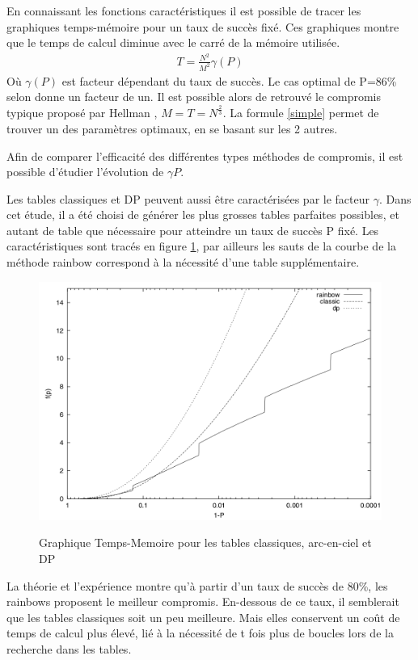 	En connaissant les fonctions caractéristiques il est possible de tracer les graphiques temps-mémoire pour un taux de succès fixé. Ces graphiques montre que le temps de calcul diminue avec le carré de la mémoire utilisée.
\begin{align*}\label{simple}
	T=\frac{N^2}{M^2}\gamma(P)
\end{align*}
	Où $\gamma(P)$ est facteur dépendant du taux de succès. Le cas optimal de P=86\% selon \cite{checkpoints} donne un facteur de un. Il est possible alors de retrouvé le compromis typique proposé par Hellman \cite{ehellman}, $M=T=N^{\frac{2}{3}}$. La formule \ref{simple} permet de trouver un des paramètres optimaux, en se basant sur les 2 autres.

	Afin de comparer l'efficacité des différentes types méthodes de compromis, il est possible d'étudier l'évolution de $\gamma{P}$.
	
	Les tables classiques et DP peuvent aussi être caractérisées par le facteur $\gamma$. Dans cet étude, il a été choisi de générer les plus grosses tables parfaites possibles, et autant de table que nécessaire pour atteindre un taux de succès P fixé. Les caractéristiques sont tracés en figure \ref{fig:TMTO_carac}, par ailleurs les sauts de la courbe de la méthode \gls{rainbow} correspond à la nécessité d'une table supplémentaire.
\begin{figure}[h!]
	\includegraphics[scale=0.25]{other/graph_gamma_P.png}
	\caption{}{Graphique Temps-Memoire pour les tables classiques, arc-en-ciel et DP}
	\label{fig:TMTO_carac}
\end{figure}
	La théorie et l'expérience montre qu'à partir d'un taux de succès de 80\%, les \glspl{rainbow} proposent le meilleur compromis. En-dessous de ce taux, il semblerait que les tables classiques soit un peu meilleure. Mais elles conservent un coût de temps de calcul plus élevé, lié à la nécessité de t fois plus de boucles lors de la recherche dans les tables.

